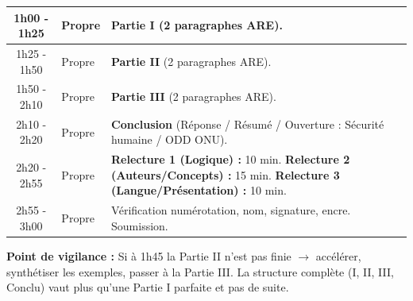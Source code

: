 \documentclass[11pt]{article}
\begin{document}
\begin{exoresolu}
\begin{center}
\begin{tabularx}{\linewidth}{|c|l|X|}
1h00 - 1h25 & Propre & \textbf{Partie I} (2 paragraphes ARE). \\ \hline
1h25 - 1h50 & Propre & \textbf{Partie II} (2 paragraphes ARE). \\ \hline
1h50 - 2h10 & Propre & \textbf{Partie III} (2 paragraphes ARE). \\ \hline
2h10 - 2h20 & Propre & \textbf{Conclusion} (Réponse / Résumé / Ouverture : Sécurité humaine / ODD ONU). \\ \hline
2h20 - 2h55 & Propre & \textbf{Relecture 1 (Logique) :} 10 min. \textbf{Relecture 2 (Auteurs/Concepts) :} 15 min. \textbf{Relecture 3 (Langue/Présentation) :} 10 min. \\ \hline
2h55 - 3h00 & Propre & Vérification numérotation, nom, signature, encre. Soumission. \\ \hline
\end{tabularx}
\end{center}

\textbf{Point de vigilance :} Si à 1h45 la Partie II n'est pas finie $\rightarrow$ accélérer, synthétiser les exemples, passer à la Partie III. La structure complète (I, II, III, Conclu) vaut plus qu'une Partie I parfaite et pas de suite.
\end{exoresolu}
\end{document}
